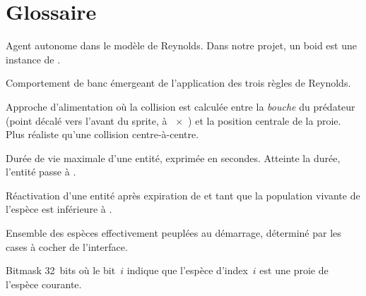 \section{Glossaire}

\begin{description}[leftmargin=3em, style=nextline]
  \item[Boid.] Agent autonome dans le modèle de Reynolds. Dans
    notre projet, un boid est une instance de .

  \item[Flocking.] Comportement de banc émergeant de
    l'application des trois règles de Reynolds.

  \item[Mouth-based eating.] Approche d'alimentation où la
    collision est calculée entre la \emph{bouche} du prédateur
    (point décalé vers l'avant du sprite, à
    ~$\times$~) et
    la position centrale de la proie. Plus réaliste qu'une
    collision centre-à-centre.

  \item[Lifespan.] Durée de vie maximale d'une entité, exprimée
    en secondes. Atteinte la durée, l'entité passe à
    .

  \item[Respawn.] Réactivation d'une entité  après
    expiration de  et tant que la population
    vivante de l'espèce est inférieure à .

  \item[Pool.] Ensemble des espèces effectivement peuplées au
    démarrage, déterminé par les cases à cocher de l'interface.

  \item[Pred mask.] Bitmask 32~bits où le bit~$i$ indique que
    l'espèce d'index~$i$ est une proie de l'espèce courante.
\end{description}

